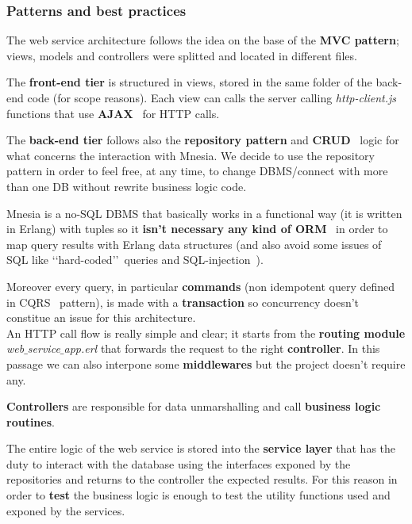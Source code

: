 \subsubsection{Patterns and best practices}

The web service architecture follows the idea on the base of the \textbf{MVC pattern}; 
views, models and controllers were splitted and located in different files. 

The \textbf{front-end tier} is structured in views, stored in the same folder of the 
back-end code (for scope reasons). 
Each view can calls the server calling \textit{http-client.js} 
functions that use \textbf{AJAX}~\cite{12} for HTTP calls. 

The \textbf{back-end tier} follows also the \textbf{repository pattern} and 
\textbf{CRUD}~\cite{13} logic 
for what concerns the interaction with Mnesia. We decide to use the repository pattern 
in order to feel free, at any time, to change DBMS/connect with more than one DB without 
rewrite business logic code.

Mnesia is a no-SQL DBMS that basically works in a functional way (it is written in Erlang)
with tuples so it \textbf{isn't necessary any kind of ORM}~\cite{7} in order 
to map query results with Erlang data structures (and also avoid some issues of SQL 
like \lq\lq hard-coded\rq\rq\ queries and SQL-injection~\cite{8}).

Moreover every query, in particular \textbf{commands} (non idempotent query defined in 
CQRS~\cite{14} pattern), is made with a \textbf{transaction} so concurrency 
doesn't constitue an issue for this architecture.\\

\noindent
An HTTP call flow is really simple and clear; it starts from the \textbf{routing module} 
\textit{web$\_$service$\_$app.erl} that forwards the request to the right 
\textbf{controller}. In this passage we can also interpone some \textbf{middlewares} 
but the project doesn't require any.

\textbf{Controllers} are responsible for data unmarshalling and 
call \textbf{business logic routines}. 

The entire logic of the web service is 
stored into the \textbf{service layer} that has the duty to interact with 
the database using the interfaces exponed by the repositories and returns to 
the controller the expected results. For this reason in order to \textbf{test} 
the business logic is enough to test the utility functions used and exponed 
by the services.  

